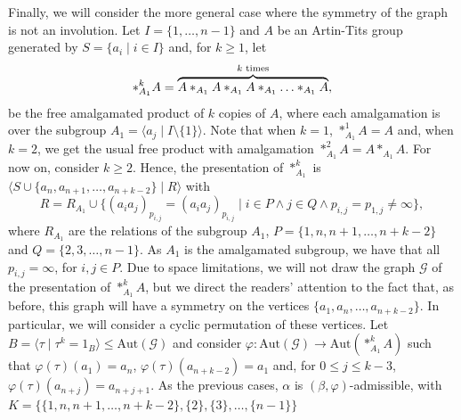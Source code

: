 \documentclass[11pt,letterpaper]{amsart}
\newcommand{\GG}{\mathcal{G}}
\newcommand{\Aut}{\mathrm{Aut}}
\begin{document}
Finally, we will consider the more general case where the symmetry of the graph is not an involution. Let $I=\{1,\ldots,n-1\}$ and $A$ be an Artin-Tits group generated by $S=\{a_i\mid i\in I\}$ and, for $k\geq 1$, let $$*^k_{A_1}A= \overbrace{A*_{A_1}A*_{A_1}A*_{A_1}\ldots*_{A_1}A}^{k \textnormal{ times}},$$ be the free amalgamated product of $k$ copies of $A$, where each amalgamation is over the subgroup $A_1=\langle a_j\mid I\setminus\{1\}\rangle$. Note that when $k=1$, $*^1_{A_1}A = A$ and, when $k=2$, we get the usual free product with amalgamation $*^2_{A_1}A = A*_{A_1}A$.
For now on, consider $k\geq 2$.
Hence, the presentation of $*^k_{A_1}$ is $\langle S\cup\{a_n,a_{n+1},\ldots,a_{n+k-2}\}\mid R\rangle$ with
$$R = R_{A_1}\cup \{(a_ia_j)_{p_{i,j}}=(a_ia_j)_{p_{i,j}}\mid i\in P \wedge j\in Q\wedge p_{i,j}=p_{1,j}\neq\infty\},$$
where $R_{A_1}$ are the relations of the subgroup $A_1$, $P=\{1,n,n+1,\ldots,n+k-2\}$ and $Q=\{2,3,\ldots,n-1\}$. As $A_1$ is the amalgamated subgroup, we have that all $p_{i,j}=\infty$, for $i,j\in P$.
Due to space limitations, we will not draw the graph $\GG$ of the presentation of $*^k_{A_1}A$, but we direct the readers' attention to the fact that, as before, this graph will have a symmetry on the vertices $\{a_1,a_n,\ldots,a_{n+k-2}\}$. In particular, we will consider a cyclic permutation of these vertices.
Let $B=\langle \tau\mid \tau^k=1_B\rangle\leq \Aut(\GG)$ and consider $\varphi: \Aut(\GG)\to \Aut(*^k_{A_1}A)$ such that $\varphi(\tau)(a_1)=a_n$, $\varphi(\tau)(a_{n+k-2})=a_1$ and, for $0\leq j\leq k-3$, $\varphi(\tau)(a_{n+j})=a_{n+j+1}$. As the previous cases, $\alpha$ is $(\beta,\varphi)$-admissible, with $K=\{\{1,n,n+1,\ldots, n+k-2\},\{2\},\{3\},\ldots,\{n-1\}\}$
\end{document}
